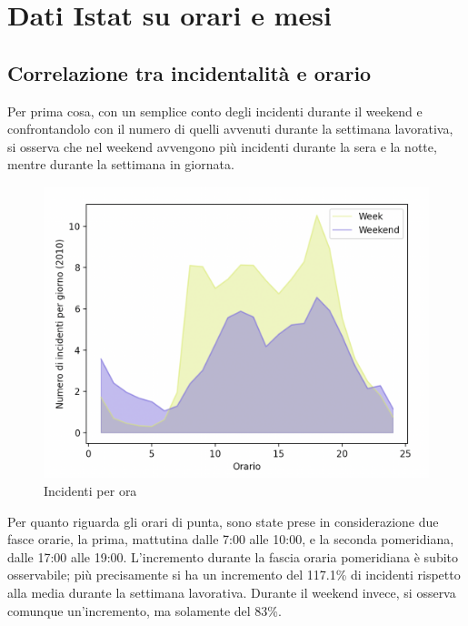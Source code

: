 \documentclass[a4paper]{report}
\begin{document}
\section{Dati Istat su orari e mesi}

\subsection{Correlazione tra incidentalità e orario}

Per prima cosa, con un semplice conto degli incidenti durante il weekend 
e confrontandolo con il numero di quelli avvenuti durante la 
settimana lavorativa, si osserva che nel weekend avvengono più incidenti 
durante la sera e la notte, mentre durante la settimana in giornata.

\begin{figure}
    \includegraphics[width=\linewidth]{../src/incidenti/incidenti_senza_coords/ore_punta/week_weekend.png}
    \caption{Incidenti per ora}
    \label{fig:week_weekend}
\end{figure}

Per quanto riguarda gli orari di punta, sono state prese in considerazione due fasce orarie, la prima, 
mattutina dalle 7:00 alle 10:00, e la seconda pomeridiana, dalle 17:00 alle 19:00.
L'incremento durante la fascia oraria pomeridiana è subito osservabile; più precisamente si 
ha un incremento del 117.1\% di incidenti rispetto alla media durante la settimana lavorativa. 
Durante il weekend invece, si osserva comunque un'incremento, ma solamente del 83\%.

\end{document}

